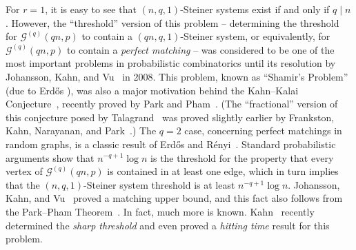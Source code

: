 \documentclass[11pt]{article}
\numberwithin{equation}{section}
\newcounter{i}
\theoremstyle{plain}
\theoremstyle{plain} %
\theoremstyle{definition}
\newcommand{\cG}{\mathcal{G}}
\begin{document}
For $r = 1$, it is easy to see that $(n,q,1)$-Steiner systems exist if and only if $q \mid n$.  However, the ``threshold'' version of this problem -- determining the threshold for $\cG^{(q)}(qn,p)$ to contain a $(qn,q,1)$-Steiner system, or equivalently, for $\cG^{(q)}(qn,p)$ to contain a \textit{perfect matching} -- was considered to be one of the most important problems in probabilistic combinatorics until its resolution by Johansson, Kahn, and Vu~\cite{JKV08} in 2008. This problem, known as ``Shamir's Problem'' (due to Erd\H{o}s \cite{E81b}), was also a major motivation behind the Kahn--Kalai Conjecture~\cite{KK07}, recently proved by Park and Pham~\cite{PP23}.  (The ``fractional'' version of this conjecture posed by Talagrand~\cite{Ta10} was proved slightly earlier by Frankston, Kahn, Narayanan, and Park~\cite{FKNP21}.)  The $q = 2$ case, concerning perfect matchings in random graphs, is a classic result of Erd\H{o}s and R\'enyi~\cite{ER66}.  Standard probabilistic arguments show that $n^{-q+1}\log n$ is the threshold for the property that every vertex of $\cG^{(q)}(qn,p)$ is contained in at least one edge, which in turn implies that the $(n,q,1)$-Steiner system threshold is at least $n^{-q + 1}\log n$.  Johansson, Kahn, and Vu~\cite{JKV08} proved a matching upper bound, and this fact also follows from the Park--Pham Theorem~\cite{PP23}.  In fact, much more is known.  Kahn~\cite{Ka19, Ka22} recently determined the \textit{sharp threshold} and even proved a \textit{hitting time} result for this problem. 
\end{document}
